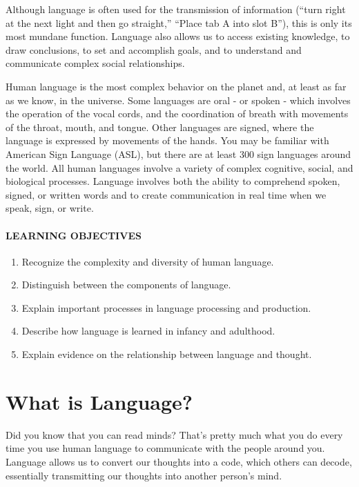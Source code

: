 \documentclass[
]{krantz}
\providecommand{\tightlist}{%
  \setlength{\itemsep}{0pt}\setlength{\parskip}{0pt}}
\begin{document}
Although language is often used for the transmission of information (``turn right at the next light and then go straight,'' ``Place tab A into slot B''), this is only its most mundane function. Language also allows us to access existing knowledge, to draw conclusions, to set and accomplish goals, and to understand and communicate complex social relationships.

Human language is the most complex behavior on the planet and, at least as far as we know, in the universe. Some languages are oral - or spoken - which involves the operation of the vocal cords, and the coordination of breath with movements of the throat, mouth, and tongue. Other languages are signed, where the language is expressed by movements of the hands. You may be familiar with American Sign Language (ASL), but there are at least 300 sign languages around the world. All human languages involve a variety of complex cognitive, social, and biological processes. Language involves both the ability to comprehend spoken, signed, or written words and to create communication in real time when we speak, sign, or write.

\paragraph*{LEARNING OBJECTIVES}\label{learning-objectives-7}

\begin{enumerate}
\def\labelenumi{\arabic{enumi}.}
\tightlist
\item
  Recognize the complexity and diversity of human language.
\item
  Distinguish between the components of language.
\item
  Explain important processes in language processing and production.
\item
  Describe how language is learned in infancy and adulthood.
\item
  Explain evidence on the relationship between language and thought.
\end{enumerate}

\section{What is Language?}\label{what-is-language}

Did you know that you can read minds? That's pretty much what you do every time you use human language to communicate with the people around you. Language allows us to convert our thoughts into a code, which others can decode, essentially transmitting our thoughts into another person's mind.
\end{document}

